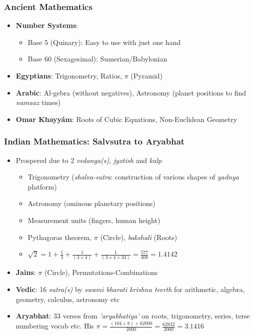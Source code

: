 \begin{frame}[fragile]
\frametitle{Ancient Mathematics}
\begin{itemize} 
\item \textbf{Number Systems}:
	\begin{itemize}
	\item Base 5 (Quinary): Easy to use with just one hand
	\item Base 60 (Sexagesimal): Sumerian/Babylonian
	\end{itemize}
\item \textbf{Egyptians}: Trigonometry, Ratios, $\pi$ (Pyramid)
\item \textbf{Arabic}: Al-gebra (without negatives), Astronomy (planet positions to find {\it namaaz} times)
\item \textbf{Omar Khayy\'am}: Roots of Cubic Equations, Non-Euclidean Geometry
\end{itemize}
\end{frame}

\begin{frame}[fragile]
\frametitle{Indian Mathematics: Salvsutra to Aryabhat}
\begin{itemize}
\item Prospered due to 2 {\it vedanga(s)}, {\it jyotish} and {\it kalp}
	\begin{itemize}
	\item Trigonometry ({\it shalva-sutra}: construction of various shapes of {\it yadnya} platform)
	\item Astronomy (ominous planetary positions)
	\item Measurement units (fingers, human height)
	\item Pythagoras theorem, $\pi$ (Circle), {\it bakshali} (Roots)
	\item $\sqrt{2} = 1 + \frac{1}{3} + \frac{1}{(3 \times 4)} + \frac{1}{(3 \times 4 \times 34)} = \frac{577}{408} = 1.4142$
	\end{itemize}
\item \textbf{Jains}: $\pi$ (Circle), Permutations-Combinations
\item \textbf{Vedic}: 16 {\it sutra(s)} by {\it swami bharati krishna teerth} for  arithmetic, algebra, geometry, calculus, astronomy etc
\item \textbf{Aryabhat}: 33 verses from {\it 'aryabhatiya'} on roots, trigonometry, series, terse numbering vocab etc. His $\pi =  \frac{(104 \times 8)+62000}{2000} = \frac{62832}{2000} = 3.1416$
\end{itemize}
\end{frame}


